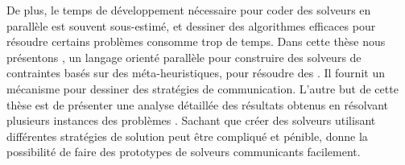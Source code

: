 De plus, le temps de d\'eveloppement n\'ecessaire pour coder des solveurs en parall\`ele est souvent sous-estim\'e, et dessiner des algorithmes efficaces pour r\'esoudre certains probl\`emes consomme trop de temps. Dans cette thèse nous présentons \posl{}, un langage orient\'e parall\`ele pour construire des solveurs de contraintes bas\'es sur des m\'eta-heuristiques, pour r\'esoudre des \csps. Il fournit un m\'ecanisme pour dessiner des stratégies de communication. L'autre but de cette thèse est de présenter une analyse d\'etaill\'ee des r\'esultats obtenus en r\'esolvant plusieurs instances des probl\`emes \csp. Sachant que cr\'eer des solveurs utilisant diff\'erentes strat\'egies de solution peut être compliqu\'e et p\'enible, \posl{} donne la possibilit\'e de faire des prototypes de solveurs communicants facilement.